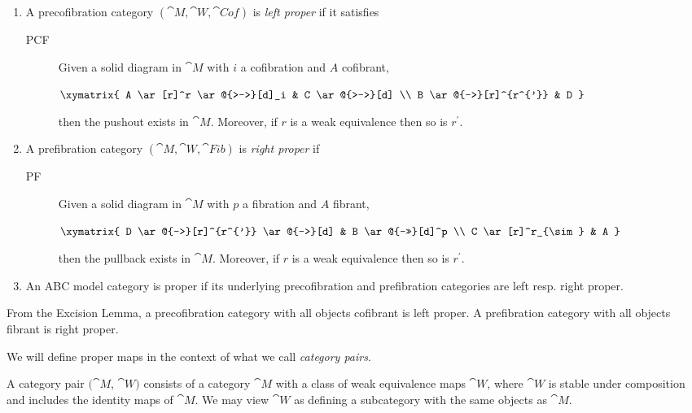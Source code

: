 \begin{defn}
\label{defn:propercofcat}
\mbox{}
\begin{enumerate}
\item
A precofibration category $({\cat M}, {\cat W}, {\cat Cof})$ is {\it left proper} if it satisfies
\begin{description}
\item[PCF] 
Given a solid diagram in ${\cat M}$ with $i$ a cofibration and $A$ cofibrant,
\begin{center}
$ \xymatrix {
	A \ar[r]^r \ar@{>->}[d]_i &
	C \ar@{>-->}[d] \\
	B \ar@{-->}[r]^{r^{'}} &
	D
	}$
\end{center}
then the pushout exists in ${\cat M}$. Moreover, if $r$ is a weak equivalence then so is $r^{'}$.
\end{description}
\item
A prefibration category $({\cat M}, {\cat W}, {\cat Fib})$ is {\it right proper} if 
\begin{description}
\item[PF] 
Given a solid diagram in ${\cat M}$ with $p$ a fibration and $A$ fibrant,
\begin{center}
$ \xymatrix {
        D \ar@{-->}[r]^{r^{'}} \ar@{-->}[d] & B \ar@{->>}[d]^p \\
        C \ar[r]^r_{\sim} & A
	}$
\end{center}
then the pullback exists in ${\cat M}$. Moreover, if $r$ is a weak equivalence then so is $r^{'}$.
\end{description}
\item
An ABC model category is proper if its underlying precofibration and prefibration categories are left resp. right proper.
\end{enumerate}
\end{defn}

From the Excision Lemma, a precofibration category with all objects cofibrant is left proper. A prefibration category with all objects fibrant is right proper.

We will define proper maps in the context of what we call {\it category pairs}.

\begin{defn}
\label{defn:catweakequiv}
A category pair $({\cat M}$, ${\cat W})$ consists of a category ${\cat M}$ with a class of weak equivalence maps ${\cat W}$, where ${\cat W}$  is stable under composition and includes the identity maps of ${\cat M}$. We may view ${\cat W}$ as defining a subcategory with the same objects as ${\cat M}$. 
\end{defn}

